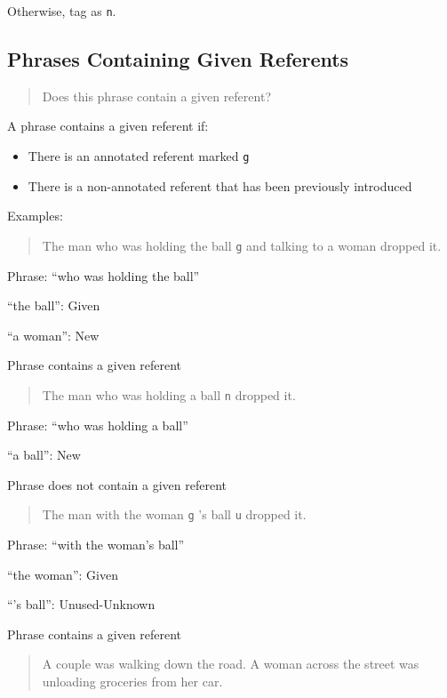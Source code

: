 \documentclass[
]{book}
\begin{document}
Otherwise, tag as \texttt{n}.

\hypertarget{phrases-containing-given-referents}{%
\subsection{Phrases Containing Given Referents}\label{phrases-containing-given-referents}}

\begin{quote}
Does this phrase contain a given referent?
\end{quote}

A phrase contains a given referent if:

\begin{itemize}
\item
  There is an annotated referent marked \texttt{g}
\item
  There is a non-annotated referent that has been previously introduced
\end{itemize}

Examples:

\begin{quote}
The man who was holding the ball \texttt{g} and talking to a woman dropped it.
\end{quote}

Phrase: ``who was holding the ball''

``the ball'': Given

``a woman'': New

Phrase contains a given referent

\begin{quote}
The man who was holding a ball \texttt{n} dropped it.
\end{quote}

Phrase: ``who was holding a ball''

``a ball'': New

Phrase does not contain a given referent

\begin{quote}
The man with the woman \texttt{g} 's ball \texttt{u} dropped it.
\end{quote}

Phrase: ``with the woman's ball''

``the woman'': Given

``'s ball'': Unused-Unknown

Phrase contains a given referent

\begin{quote}
A couple was walking down the road.
A woman across the street was unloading groceries from her car.
\end{quote}
\end{document}

